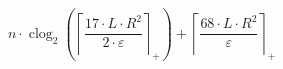 \[n \cdot \operatorname{clog}_{2}\left(\left\lceil \frac{17 \cdot L \cdot R^{2}}{2 \cdot \varepsilon} \right\rceil_{+}\right) + \left\lceil \frac{68 \cdot L \cdot R^{2}}{\varepsilon} \right\rceil_{+}\]
